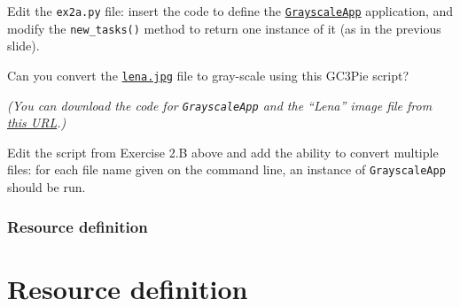 \documentclass[english,serif,mathserif,xcolor=pdftex,dvipsnames,table]{beamer}
\begin{document}
\begin{frame}[fragile]
  \small

  \begin{exercise*}[2.B]

    \+
    Edit the \texttt{ex2a.py} file: insert the code to define the
    \href{https://raw.githubusercontent.com/uzh/gc3pie/training-july-2016/docs/programmers/tutorials/workflows/grayscale_app.py}{\texttt{GrayscaleApp}}
    application, and modify the \texttt{new\_tasks()} method to return
    one instance of it (as in the previous slide).

    \+
    Can you convert the \href{https://raw.githubusercontent.com/uzh/gc3pie/training-july-2016/docs/programmers/tutorials/workflows/lena.jpg}{\texttt{lena.jpg}} file to gray-scale using
    this GC3Pie script?

    \+ \footnotesize
    {\em (You can download the code for \texttt{GrayscaleApp} and the ``Lena'' image file from
    \href{https://raw.githubusercontent.com/uzh/gc3pie/training-july-2016/docs/programmers/tutorials/workflows/}{this
      URL}.)}
  \end{exercise*}

  \+
  \begin{exercise*}[2.C]

    Edit the script from Exercise 2.B above and add the ability to
    convert multiple files: for each file name given on the command
    line, an instance of \texttt{GrayscaleApp} should be run.
  \end{exercise*}
\end{frame}


\section{Resource definition}
\part{Resource definition}
\end{document}
